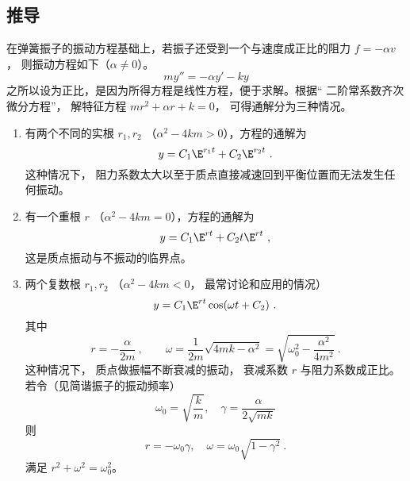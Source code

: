 \subsection{推导}
在弹簧振子的振动方程基础上，若振子还受到一个与速度成正比的阻力 $f =  - \alpha v$， 则振动方程如下（$\alpha \ne 0$）。
\begin{equation}
my'' =  - \alpha y' - ky
\end{equation}
之所以设为正比，是因为所得方程是线性方程，便于求解。根据“ 二阶常系数齐次微分方程”， 解特征方程 $m r^2 + \alpha r + k = 0$， 可得通解分为三种情况。
\begin{enumerate}
\item 有两个不同的实根 $r_1, r_2$ （$\alpha ^2 - 4km > 0$），方程的通解为
\begin{equation}
y = C_1 \E^{r_1 t} + C_2 \E^{r_2 t}~.
\end{equation}
这种情况下， 阻力系数太大以至于质点直接减速回到平衡位置而无法发生任何振动。

\item 有一个重根 $r$ （$\alpha ^2 - 4km = 0$），方程的通解为
\begin{equation}
y = C_1 \E^{rt} + C_2 t \E^{rt}~,
\end{equation}
这是质点振动与不振动的临界点。

\item 两个复数根 $r_1,r_2$ （$\alpha ^2 - 4km < 0$， 最常讨论和应用的情况）
\begin{equation}
y = C_1 \E^{rt}\cos(\omega t + C_2)~.
\end{equation}
其中
\begin{equation}
r =  - \frac{\alpha }{2m}~,
\qquad
\omega = \frac{1}{2m}\sqrt {4mk - \alpha ^2}  = \sqrt{\omega_0^2 - \frac{\alpha ^2}{4 m^2}}~.
\end{equation}
这种情况下， 质点做振幅不断衰减的振动， 衰减系数 $r$ 与阻力系数成正比。 若令（见简谐振子的振动频率）
\begin{equation}
\omega_0 = \sqrt{\frac{k}{m}}, \quad \gamma  = \frac{\alpha }{2\sqrt{mk}}
\end{equation}
则 
\begin{equation}
r =  - \omega_0 \gamma,\quad \omega  = \omega_0 \sqrt{1 - \gamma ^2}~.
\end{equation}
满足
$r^2 + \omega ^2 = \omega_0^2$。
\end{enumerate}


